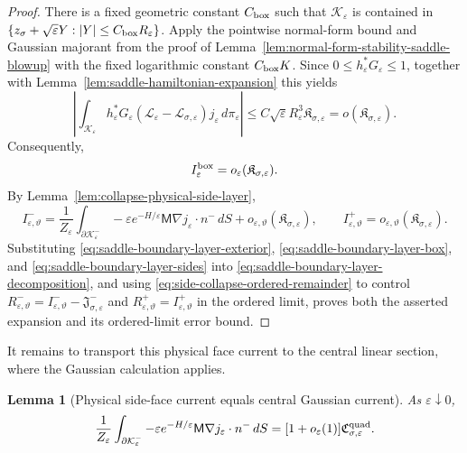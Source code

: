 \documentclass[11pt]{article}
\numberwithin{equation}{section}
\theoremstyle{plain}
\newtheorem{lemma}[theorem]{Lemma}
\theoremstyle{definition}
\theoremstyle{remark}
\newcommand{\eps}{\varepsilon}
\newcommand{\calL}{\mathcal L}
\begin{document}
\begin{proof}
There is a fixed geometric constant $C_{\rm box}$ such that
$\mathcal K_\eps$ is contained in
$\{z_\sigma+\sqrt\eps Y:|Y|\le C_{\rm box}R_\eps\}$.  Apply the pointwise
normal-form bound and Gaussian majorant from the proof of
Lemma~\ref{lem:normal-form-stability-saddle-blowup} with the fixed logarithmic
constant $C_{\rm box}K$.  Since $0\le h_\eps^*G_\eps\le1$, together with
Lemma~\ref{lem:saddle-hamiltonian-expansion} this yields
\[
\left|\int_{\mathcal K_\eps}h_\eps^*
G_\eps(\calL_\eps-\calL_{\sigma,\eps})j_\eps\,d\pi_\eps\right|
\le C\sqrt\eps R_\eps^3\mathfrak K_{\sigma,\eps}
=o(\mathfrak K_{\sigma,\eps}).
\]
Consequently,
\begin{equation}
\label{eq:saddle-boundary-layer-box}
I_\eps^{\rm box}=o_\eps(\mathfrak K_{\sigma,\eps}).
\end{equation}
By Lemma~\ref{lem:collapse-physical-side-layer},
\begin{equation}
\label{eq:saddle-boundary-layer-sides}
I_{\eps,\vartheta}^-
=\frac1{Z_\eps}\int_{\partial\mathcal K_\eps^-}
-\eps e^{-H/\eps}\mathsf M\nabla j_\eps\cdot n^-\,dS
+o_{\eps,\vartheta}(\mathfrak K_{\sigma,\eps}),
\qquad
I_{\eps,\vartheta}^+=o_{\eps,\vartheta}(\mathfrak K_{\sigma,\eps}).
\end{equation}
Substituting \eqref{eq:saddle-boundary-layer-exterior},
\eqref{eq:saddle-boundary-layer-box}, and
\eqref{eq:saddle-boundary-layer-sides} into
\eqref{eq:saddle-boundary-layer-decomposition}, and using
\eqref{eq:side-collapse-ordered-remainder} to control
$R_{\eps,\vartheta}^-=I_{\eps,\vartheta}^--\mathfrak J_{\sigma,\eps}^-$ and
$R_{\eps,\vartheta}^+=I_{\eps,\vartheta}^+$ in the ordered limit, proves both the
asserted expansion and its ordered-limit error bound.
\end{proof}

It remains to transport this physical face current to the
central linear section, where the Gaussian calculation applies.

\begin{lemma}[Physical side-face current equals central Gaussian current]
\label{lem:artificial-surface-current}
As $\eps\downarrow 0$,
\[
\frac1{Z_\eps}\int_{\partial\mathcal K_\eps^-}
-\eps e^{-H/\eps}\mathsf M\nabla j_\eps\cdot n^-\,dS
=[1+o_\eps(1)]\mathfrak C_{\sigma,\eps}^{\rm quad}.
\]
\end{lemma}
\end{document}

